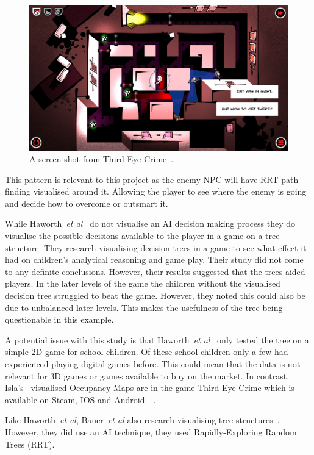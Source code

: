 \documentclass[journal]{IEEEtran}
\begin{document}
\begin{figure}[h]
	\includegraphics[width=1.0\linewidth]{ThirdEyeCrime.jpg}
	\caption{ A screen-shot from Third Eye Crime~\cite{game:ThirdEyeCrime}.}
	\label{image:ThirdEyeCrime}
\end{figure}  

This pattern is relevant to this project as the enemy NPC will have RRT path-finding visualised around it. Allowing the player to see where the enemy is going and decide how to overcome or outsmart it.

While Haworth~\textit{et al}~\cite{Haworth2010} do not visualise an AI decision making process they do visualise the possible decisions available to the player in a game on a tree structure.   They research visualising decision trees in a game to see what effect it had on children's analytical reasoning and game play.  
Their study did not come to any definite conclusions. However, their results suggested that the trees aided players. In the later levels of the game the children without the visualised decision tree struggled to beat the game.   However, they noted this could also be due to unbalanced later levels.  This makes the usefulness of the tree being questionable in this example.  

A potential issue with this study is that Haworth~\textit{et al}~\cite{Haworth2010} only tested the tree on a simple 2D game for school children. Of these school children only a few had experienced playing digital games before.  This could mean that the data is not relevant for 3D games or games available to buy on the market.  In contrast, Isla's~\cite{Isla2014} visualised Occupancy Maps are in the game Third Eye Crime which is available on Steam, IOS and Android~\cite{Isla2014}~\cite{game:ThirdEyeCrime}.

Like  Haworth~\textit{et al}, Bauer~\textit{et al} also research visualising tree structures~\cite{bauer2012}. However, they did use an AI technique, they used Rapidly-Exploring Random Trees (RRT).
\end{document}
